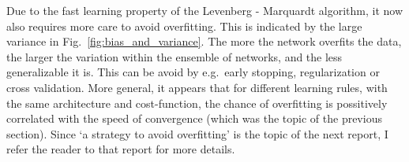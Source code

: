 \documentclass[10pt,a4paper]{article}
\begin{document}
Due to the fast learning property of the Levenberg - Marquardt algorithm, it now also requires more care to avoid overfitting. This is indicated by the large variance in Fig.~\ref{fig:bias_and_variance}. The more the network overfits the data, the larger the variation within the ensemble of networks, and the less generalizable it is. This can be avoid by e.g.\ early stopping, regularization or cross validation. More general, it appears that for different learning rules, with the same architecture and cost-function, the chance of overfitting is possitively correlated with the speed of convergence (which was the topic of the previous section). Since `a strategy to avoid overfitting' is the topic of the next report, I refer the reader to that report for more details.
\end{document}
